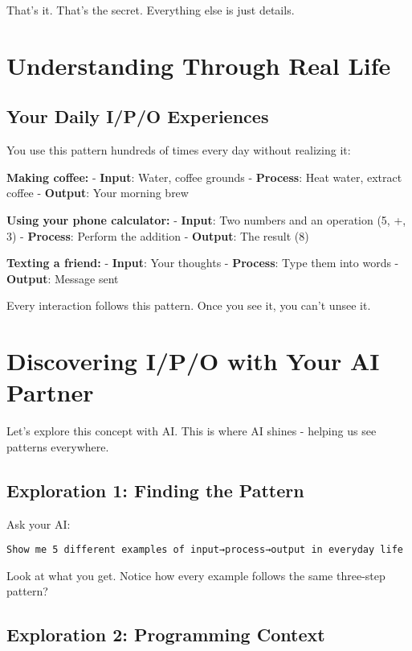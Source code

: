 \documentclass[
  letterpaper,
  DIV=11,
  numbers=noendperiod,
  oneside]{scrreprt}
\begin{document}
That's it. That's the secret. Everything else is just details.

\section{Understanding Through Real
Life}\label{understanding-through-real-life}

\subsection{Your Daily I/P/O
Experiences}\label{your-daily-ipo-experiences}

You use this pattern hundreds of times every day without realizing it:

\textbf{Making coffee:} - \textbf{Input}: Water, coffee grounds -
\textbf{Process}: Heat water, extract coffee - \textbf{Output}: Your
morning brew

\textbf{Using your phone calculator:} - \textbf{Input}: Two numbers and
an operation (5, +, 3) - \textbf{Process}: Perform the addition -
\textbf{Output}: The result (8)

\textbf{Texting a friend:} - \textbf{Input}: Your thoughts -
\textbf{Process}: Type them into words - \textbf{Output}: Message sent

Every interaction follows this pattern. Once you see it, you can't unsee
it.

\section{Discovering I/P/O with Your AI
Partner}\label{discovering-ipo-with-your-ai-partner}

Let's explore this concept with AI. This is where AI shines - helping us
see patterns everywhere.

\subsection{Exploration 1: Finding the
Pattern}\label{exploration-1-finding-the-pattern}

Ask your AI:

\begin{verbatim}
Show me 5 different examples of input→process→output in everyday life
\end{verbatim}

Look at what you get. Notice how every example follows the same
three-step pattern?

\subsection{Exploration 2: Programming
Context}\label{exploration-2-programming-context}
\end{document}
